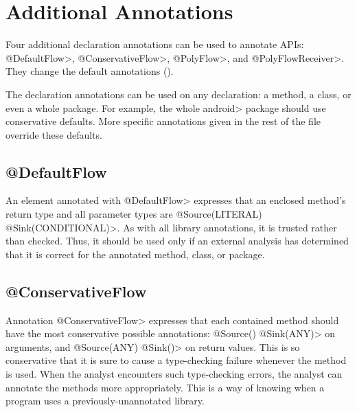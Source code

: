 


\section{Additional Annotations\label{sec:addtionalanno}}

Four additional declaration annotations can be used to annotate APIs:
\<@DefaultFlow>, \<@ConservativeFlow>, \<@PolyFlow>, and \<@PolyFlowReceiver>. 
They change the default annotations ().
 
The declaration annotations can be used on any declaration: a method,
a class, or even a whole package.
For example, the
whole \<android> package should use conservative defaults.
More specific annotations given in the rest of the file override these
defaults.


\subsection{@DefaultFlow}

An element annotated with \<@DefaultFlow> expresses that an enclosed
method's return type and all parameter types are \<@Source(LITERAL)
@Sink(CONDITIONAL)>.  As with all 
library annotations, it is trusted rather than checked.  Thus, it should be
used only if an external analysis has determined that it is correct for the
annotated method, class, or package.




\subsection{@ConservativeFlow}

Annotation \<@ConservativeFlow> expresses that each contained method
should have the most conservative possible annotations:
  \<@Source({}) @Sink(ANY)> on arguments, and
  \<@Source(ANY) @Sink({})> on return values.
This is so conservative that it is sure to cause a type-checking failure
whenever the method is used.
When the analyst encounters such type-checking errors, the analyst can
annotate the methods more appropriately.  This is a way of knowing when a
program uses a previously-unannotated library.


